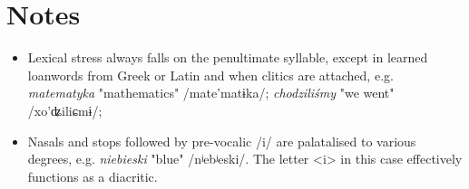 \section*{Notes}

\begin{itemize}
    \item Lexical stress always falls on the penultimate syllable, except in learned loanwords from Greek or Latin and when clitics are attached, e.g. \textit{matematyka} "mathematics" /mate'matɨka/; \textit{chodziliśmy} "we went" /xo'ʥiliɕmɨ/; 
    \item Nasals and stops followed by pre-vocalic /i/ are palatalised to various degrees, e.g. \textit{niebieski} "blue" /nʲebʲeski/. The letter <i> in this case effectively functions as a diacritic.
\end{itemize}
